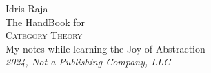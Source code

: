 \begin{titlepage}
  \raggedleft
  {\Large Idris Raja\\[1in]}
  {\large The HandBook for\\}
  {\Huge\scshape Category Theory\\[.2in]}
  {\large My notes while learning the Joy of Abstraction\\}
  \vfill
    {\itshape 2024, Not a Publishing Company, LLC}
\end{titlepage}
